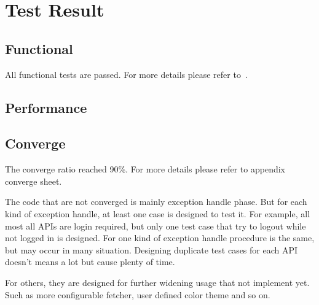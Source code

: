 \section{Test Result}
\label{sec:test_result}
  \subsection{Functional}
    All functional tests are passed. For more details please refer to~.
  \subsection{Performance}
  \subsection{Converge}
    The converge ratio reached 90\%.
    For more details please refer to appendix converge sheet.

    The code that are not converged is mainly exception handle phase.
    But for each kind of exception handle, at least one case is designed to test it.
    For example, all most all APIs are login required,
    but only one test case that try to logout while not logged in is designed.
    For one kind of exception handle procedure is the same, but may occur in many situation.
    Designing duplicate test cases for each API doesn't means a lot but cause plenty of time.

    For others, they are designed for further widening usage that not implement yet.
    Such as more configurable fetcher, user defined color theme and so on.
